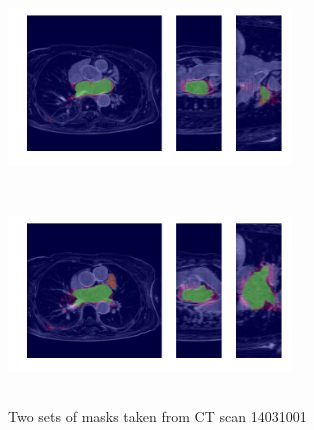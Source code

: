 \begin{figure}[H]
\centering
\label{final_model}
\begin{minipage}{0.45\textwidth}
\centering
{\includegraphics[trim=0cm 2cm 0cm 2cm, clip=true, height=50mm, width=75mm]{Appendix/img/Masks_for_14031001_0.png}}
\end{minipage}\hfill
\begin{minipage}{0.45\textwidth}
\centering
{\includegraphics[trim=0cm 2cm 0cm 2cm, clip=true, height=50mm, width=75mm]{Appendix/img/Masks_for_14031001_1.png}}
\end{minipage}
\caption{Two sets of masks taken from CT scan 14031001}
\end{figure}

